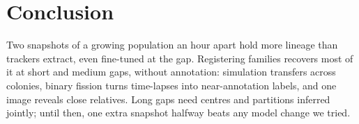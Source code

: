 \section{Conclusion}
\label{sec:conclusion}
Two snapshots of a growing population an hour apart hold more lineage than trackers extract, even fine-tuned at the gap.
Registering families recovers most of it at short and medium gaps, without annotation: simulation transfers across colonies, binary fission turns time-lapses into near-annotation labels, and one image reveals close relatives.
Long gaps need centres and partitions inferred jointly; until then, one extra snapshot halfway beats any model change we tried.
